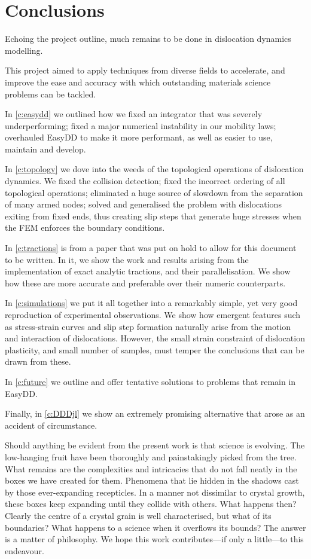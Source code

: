 \chapter{Conclusions}
\label{c:conclusions}

Echoing the project outline, much remains to be done in dislocation dynamics modelling.

This project aimed to apply techniques from diverse fields to accelerate, and improve the ease and accuracy with which outstanding materials science problems can be tackled.

In \cref{c:easydd} we outlined how we fixed an integrator that was severely underperforming; fixed a major numerical instability in our mobility laws; overhauled EasyDD to make it more performant, as well as easier to use, maintain and develop.

In \cref{c:topology} we dove into the weeds of the topological operations of dislocation dynamics. We fixed the collision detection; fixed the incorrect ordering of all topological operations; eliminated a huge source of slowdown from the separation of many armed nodes; solved and generalised the problem with dislocations exiting from fixed ends, thus creating slip steps that generate huge stresses when the FEM enforces the boundary conditions.

In \cref{c:tractions} is from a paper that was put on hold to allow for this document to be written. In it, we show the work and results arising from the implementation of exact analytic tractions, and their parallelisation. We show how these are more accurate and preferable over their numeric counterparts.

In \cref{c:simulations} we put it all together into a remarkably simple, yet very good reproduction of experimental observations. We show how emergent features such as stress-strain curves and slip step formation naturally arise from the motion and interaction of dislocations. However, the small strain constraint of dislocation plasticity, and small number of samples, must temper the conclusions that can be drawn from these.

In \cref{c:future} we outline and offer tentative solutions to problems that remain in EasyDD.

Finally, in \cref{c:DDDjl} we show an extremely promising alternative that arose as an accident of circumstance.

Should anything be evident from the present work is that science is evolving. The low-hanging fruit have been thoroughly and painstakingly picked from the tree. What remains are the complexities and intricacies that do not fall neatly in the boxes we have created for them. Phenomena that lie hidden in the shadows cast by those ever-expanding recepticles. In a manner not dissimilar to crystal growth, these boxes keep expanding until they collide with others. What happens then? Clearly the centre of a crystal grain is well characterised, but what of its boundaries? What happens to a science when it overflows its bounds? The answer is a matter of philosophy. We hope this work contributes---if only a little---to this endeavour.
\savearabiccounter
